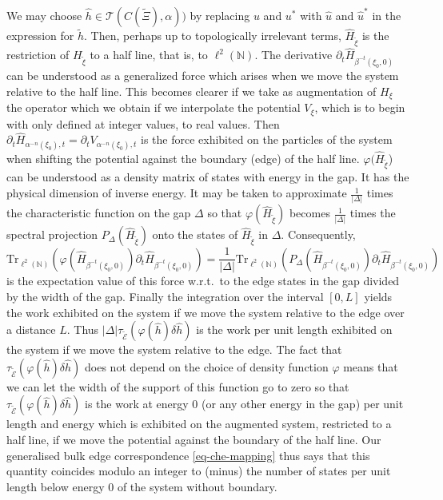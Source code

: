\documentclass[11pt]{amsart}
\newcommand{\N}{\mathbb{N}}
\begin{document}
We may choose $\hat h \in {\mathcal T}(C(\tilde\Xi),\alpha))$  
by replacing $u$ and $u^*$ with $\hat u$ and $\hat u^*$ in the expression for $\tilde h$. Then, perhaps up to topologically irrelevant terms,  
$\hat H_{\tilde\xi}$ is the restriction of $H_{\tilde\xi}$ to a half line, that is, to $\ell^2(\N)$. 
The derivative $\partial_t \hat{H}_{\beta^{-t}(\xi_0,0)}$ can be understood as a generalized force which arises when we move the system relative to the half line. This becomes clearer if we take as augmentation of $H_\xi$ the operator which we obtain if we interpolate the potential $V_\xi$, which is to begin with only defined at integer values, to real values. Then 
$\partial_t \hat{H}_{\alpha^{-n}(\xi_0),t}=\partial_t V_{\alpha^{-n}(\xi_0),t}$ is the force exhibited on the particles of the system when
shifting the potential against the boundary (edge) of the half line.
$\varphi(\hat{H}_{\tilde\xi}$) can be understood as a density matrix of states with energy in the gap. It has the physical dimension of inverse energy. It may be taken to approximate $\frac1{|\Delta|}$ times the characteristic function on the gap $\Delta$ so that $\varphi(\hat{H}_{\tilde\xi})$ becomes $\frac1{|\Delta|}$ times the spectral projection $P_{\Delta}(\hat{H}_{\tilde\xi})$ onto the states of $\hat{H}_{\tilde\xi}$ in $\Delta$. 
Consequently, 
$$ \mathrm{Tr}_{\ell^2(\N)}(\varphi(\hat{H}_{\beta^{-t}(\xi_0,0)})\partial_t \hat{H}_{\beta^{-t}(\xi_0,0)} )= \frac1{|\Delta|}\mathrm{Tr}_{\ell^2(\N)}(P_{\Delta}(\hat{H}_{\beta^{-t}(\xi_0,0)})\partial_t \hat{H}_{\beta^{-t}(\xi_0,0)} )$$ 
is the expectation value of this force w.r.t.\ to the edge states in the gap divided by the width of the gap. Finally the integration over the interval $[0,L]$ yields the work exhibited on the system if we move the system relative to the edge over a distance $L$. Thus 
$|\Delta| \tau_{\tilde{\mathcal  E}}(\varphi(\hat h)\delta \hat h) $ is the work 
per unit length exhibited on the system if we move the system relative to the edge. The fact that $\tau_{\tilde{\mathcal  E}}(\varphi(\hat h)\delta \hat h) $ does not depend on the choice of density function $\varphi$ means that we can let the width of the support of this function go to zero so that   
$\tau_{\tilde{\mathcal  E}}(\varphi(\hat h)\delta \hat h) $ is the work at energy $0$ (or any other energy in the gap) per unit length and energy which is exhibited on the augmented system, restricted to a half line, if we move the potential against the boundary of the half line. Our generalised bulk edge correspondence \eqref{eq-che-mapping} thus says that this quantity coincides modulo an integer to (minus) the number of states per unit length  below energy $0$ of the system without boundary.
\end{document}
